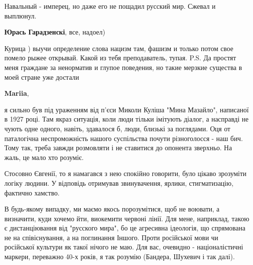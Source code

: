 \begin{itemize}
\begin{itemize}
Навальный - имперец, но даже его не пощадил русский мир. Сжевал и выплюнул.

 
\textbf{Юрась Гарадзенскі}, все, надоел)

 
Курица ) выучи определение слова нацизм там, фашизм и только потом свое помело рыжее открывай. Какой из тебя преподаватель, тупая.
P.S. Да простят меня граждане за ненорматив и глупое поведения, но такие мерзкие существа в моей стране уже достали

 
\textbf{Mariia}, 

я сильно був під ураженням від п'єси Миколи Куліша "Мина Мазайло", написаної в
1927 році. Там якраз ситуація, коли люди тільки імітують діалог, а насправді не
чують одне одного, навіть, здавалося б, люди, близькі за поглядами. Оця от
паталогічна неспроможність нашого суспільства почути різноголосся - наш бич.
Тому так, треба завжди розмовляти і не ставитися до опонента зверхньо. На жаль,
це мало хто розуміє.

Стосовно Євгенії, то я намагався з нею спокійно говорити, було цікаво зрозуміти
логіку людини. У відповідь отримував звинувачення, ярлики, стигматизацію,
фактично хамство.

В будь-якому випадку, ми маємо якось порозумітися, щоб не воювати, а визначити,
куди хочемо йти, виокемити червоні лінії. Для мене, наприклад, такою є
дистанціювання від "русского мира", бо це агресивна ідеологія, що спрямована не
на співіснування, а на поглинання Іншого. Проти російської мови чи російської
культури як такої нічого не маю. Для вас, очевидно - націоналістичні маркери,
переважно 40-х років, я так розумію (Бандера, Шухевич і так далі).

 

\end{itemize}
\end{itemize}
